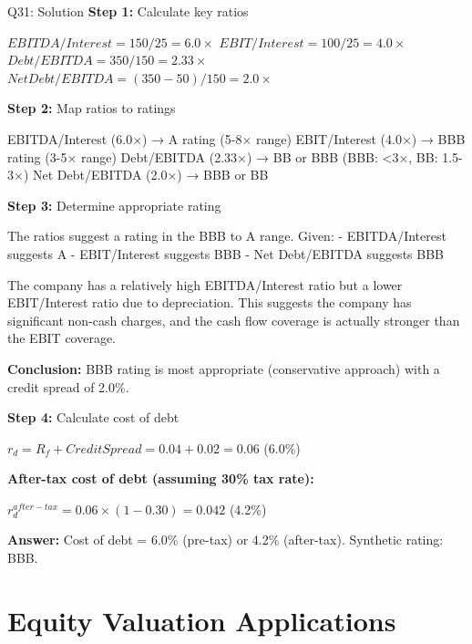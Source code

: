 \documentclass{beamer}
\renewcommand{\scriptsize}{\fontsize{6pt}{7pt}\selectfont}
\begin{document}
	\begin{frame}{Q31: Solution}
		\scriptsize
		\textbf{Step 1:} Calculate key ratios
		
		$EBITDA/Interest = 150/25 = 6.0\times$
		$EBIT/Interest = 100/25 = 4.0\times$
		$Debt/EBITDA = 350/150 = 2.33\times$
		$Net Debt/EBITDA = (350-50)/150 = 2.0\times$
		
		\vspace{2pt}
		\textbf{Step 2:} Map ratios to ratings
		
		EBITDA/Interest (6.0×) → A rating (5-8× range)
		EBIT/Interest (4.0×) → BBB rating (3-5× range)
		Debt/EBITDA (2.33×) → BB or BBB (BBB: <3×, BB: 1.5-3×)
		Net Debt/EBITDA (2.0×) → BBB or BB
		
		\vspace{2pt}
		\textbf{Step 3:} Determine appropriate rating
		
		The ratios suggest a rating in the BBB to A range. Given:
		- EBITDA/Interest suggests A
		- EBIT/Interest suggests BBB
		- Net Debt/EBITDA suggests BBB
		
		The company has a relatively high EBITDA/Interest ratio but a lower EBIT/Interest ratio due to depreciation. This suggests the company has significant non-cash charges, and the cash flow coverage is actually stronger than the EBIT coverage.
		
		\textbf{Conclusion:} BBB rating is most appropriate (conservative approach) with a credit spread of 2.0\%.
		
		\vspace{2pt}
		\textbf{Step 4:} Calculate cost of debt
		
		$r_d = R_f + Credit Spread = 0.04 + 0.02 = 0.06$ (6.0\%)
		
		\vspace{2pt}
		\textbf{After-tax cost of debt (assuming 30\% tax rate):}
		
		$r_d^{after-tax} = 0.06 \times (1 - 0.30) = 0.042$ (4.2\%)
		
		\textbf{Answer:} Cost of debt = 6.0\% (pre-tax) or 4.2\% (after-tax). Synthetic rating: BBB.
	\end{frame}
	
	
	\section{Equity Valuation Applications}
	
\end{document}

